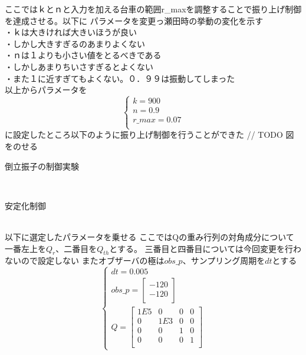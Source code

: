\documentclass{jarticle}
\begin{document}
\begin{enumerate}
\begin{enumerate}
				ここではｋとｎと入力を加える台車の範囲r\_maxを調整することで振り上げ制御を達成させる。以下に
				パラメータを変更っ瀬田時の挙動の変化を示す\\
				・ｋは大きければ大きいほうが良い\\
				・しかし大きすぎるのあまりよくない\\
				・ｎは１よりも小さい値をとるべきである\\
				・しかしあまりちいさすぎるとよくない\\
				・また１に近すぎてもよくない。０．９９は振動してしまった\\
				以上からパラメータを
				\begin{equation}
					\left\{
					\begin{array}{l}
						k = 900 \\
						n = 0.9 \\
						r\_max = 0.07\\
					\end{array}
					\right.
				\end{equation}
				に設定したところ以下のように振り上げ制御を行うことができた
				// TODO 図をのせる
			
		\end{enumerate}
		{\LARGE\item 倒立振子の制御実験}\\
		\begin{enumerate}
			{\Large\item 安定化制御}\\	
				以下に選定したパラメータを乗せる
				ここではQの重み行列の対角成分について一番左上を$Q_{r}$、二番目を$Q_{th}$とする。
				三番目と四番目については今回変更を行わないので設定しない
				またオブザーバの極は$obs\_p$、サンプリング周期を$dt$とする
				\begin{equation}
					\left\{
					\begin{array}{l}
						dt = 0.005\\
						obs\_p =　\left[
						\begin{array}{c}
							-120\\
							-120\\
						\end{array}
						\right]\\
						Q = \left[
						\begin{array}{cccc}
							1E5 & 0 & 0 & 0 \\
							0 & 1E3 & 0 & 0 \\
							0 & 0 & 1 & 0 \\
							0 & 0 & 0 & 1 \\
						\end{array}
						\right]
					\end{array}
					\right.
				\end{equation}
					

\end{enumerate}
\end{enumerate}
\end{document}
